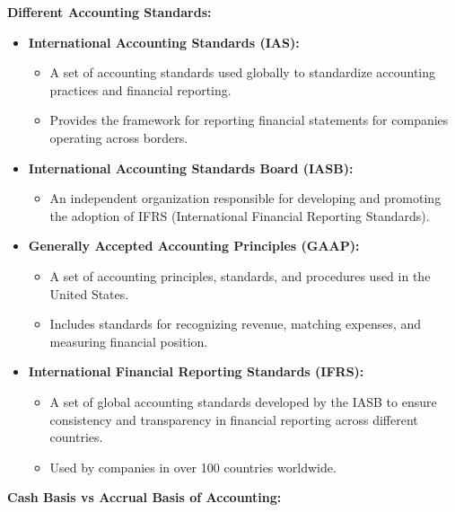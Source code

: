 \documentclass[12pt,a4paper]{book}
\begin{document}
\vspace{0.5cm}
\textbf{Different Accounting Standards:}

\begin{itemize}
    \item \textbf{International Accounting Standards (IAS):}
    \begin{itemize}
        \item A set of accounting standards used globally to standardize accounting practices and financial reporting.
        \item Provides the framework for reporting financial statements for companies operating across borders.
    \end{itemize}
    
    \item \textbf{International Accounting Standards Board (IASB):}
    \begin{itemize}
        \item An independent organization responsible for developing and promoting the adoption of IFRS (International Financial Reporting Standards).
    \end{itemize}
    
    \item \textbf{Generally Accepted Accounting Principles (GAAP):}
    \begin{itemize}
        \item A set of accounting principles, standards, and procedures used in the United States.
        \item Includes standards for recognizing revenue, matching expenses, and measuring financial position.
    \end{itemize}

    \item \textbf{International Financial Reporting Standards (IFRS):}
    \begin{itemize}
        \item A set of global accounting standards developed by the IASB to ensure consistency and transparency in financial reporting across different countries.
        \item Used by companies in over 100 countries worldwide.
    \end{itemize}
\end{itemize}

\vspace{0.5cm}
\textbf{Cash Basis vs Accrual Basis of Accounting:}
\end{document}
